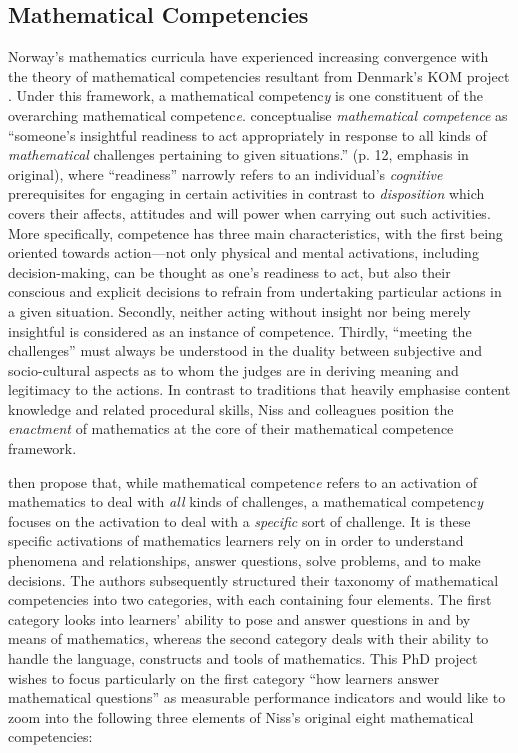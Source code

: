 \documentclass[
    a4paper,                %
    11pt,                   %
    stu,                    %
    donotrepeattitle,       %
    floatsintext,           %
    biblatex,               %
    colorlinks=true,        %
    linkcolor=red,          %
    anchorcolor=black,      %
    citecolor=blue,         %
    urlcolor=blue,          %
    bookmarks=true,         %
    bookmarksopen=false,    %
    bookmarksnumbered=true, %
    dvipsnames              %
]{apa7}
\begin{document}
\subsection{Mathematical Competencies}

Norway's mathematics curricula have experienced increasing convergence with the theory of mathematical competencies resultant from Denmark's KOM project \parencite{niss:2003,niss:2011,niss:2019}. Under this framework, a mathematical competenc\emph{y} is one constituent of the overarching mathematical competenc\emph{e}. \textcite{niss:2019} conceptualise \emph{mathematical competence} as ``someone's insightful readiness to act appropriately in response to all kinds of \emph{mathematical} challenges pertaining to given situations.'' (p. 12, emphasis in original), where ``readiness'' narrowly refers to an individual's \emph{cognitive} prerequisites for engaging in certain activities in contrast to \emph{disposition} which covers their affects, attitudes and will power when carrying out such activities. More specifically, competence has three main characteristics, with the first being oriented towards action---not only physical and mental activations, including decision-making, can be thought as one's readiness to act, but also their conscious and explicit decisions to refrain from undertaking particular actions in a given situation. Secondly, neither acting without insight nor being merely insightful is considered as an instance of competence. Thirdly, ``meeting the challenges'' must always be understood in the duality between subjective and socio-cultural aspects as to whom the judges are in deriving meaning and legitimacy to the actions. In contrast to traditions that heavily emphasise content knowledge and related procedural skills, Niss and colleagues position the \emph{enactment} of mathematics at the core of their mathematical competence framework.

\textcite{niss:2019} then propose that, while mathematical competenc\emph{e} refers to an activation of mathematics to deal with \emph{all} kinds of challenges, a mathematical competenc\emph{y} focuses on the activation to deal with a \emph{specific} sort of challenge. It is these specific activations of mathematics learners rely on in order to understand phenomena and relationships, answer questions, solve problems, and to make decisions. The authors subsequently structured their taxonomy of mathematical competencies into two categories, with each containing four elements. The first category looks into learners' ability to pose and answer questions in and by means of mathematics, whereas the second category deals with their ability to handle the language, constructs and tools of mathematics. This PhD project wishes to focus particularly on the first category ``how learners answer mathematical questions'' as measurable performance indicators and would like to zoom into the following three elements of Niss's original eight mathematical competencies:
\end{document}
